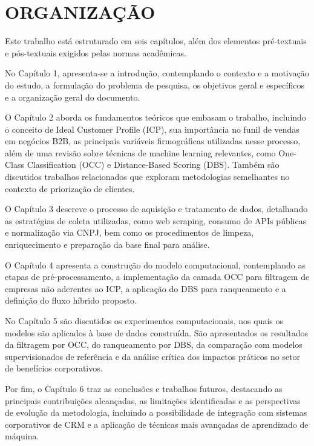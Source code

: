 \section{ORGANIZAÇÃO}

Este trabalho está estruturado em seis capítulos, além dos elementos pré-textuais e pós-textuais exigidos pelas normas acadêmicas.

No Capítulo 1, apresenta-se a introdução, contemplando o contexto e a motivação do estudo, a formulação do problema de pesquisa, os objetivos geral e específicos e a organização geral do documento.  

O Capítulo 2 aborda os fundamentos teóricos que embasam o trabalho, incluindo o conceito de Ideal Customer Profile (ICP), sua importância no funil de vendas em negócios B2B, as principais variáveis firmográficas utilizadas nesse processo, além de uma revisão sobre técnicas de machine learning relevantes, como One-Class Classification (OCC) e Distance-Based Scoring (DBS). Também são discutidos trabalhos relacionados que exploram metodologias semelhantes no contexto de priorização de clientes.  

O Capítulo 3 descreve o processo de aquisição e tratamento de dados, detalhando as estratégias de coleta utilizadas, como web scraping, consumo de APIs públicas e normalização via CNPJ, bem como os procedimentos de limpeza, enriquecimento e preparação da base final para análise.  

O Capítulo 4 apresenta a construção do modelo computacional, contemplando as etapas de pré-processamento, a implementação da camada OCC para filtragem de empresas não aderentes ao ICP, a aplicação do DBS para ranqueamento e a definição do fluxo híbrido proposto.  

No Capítulo 5 são discutidos os experimentos computacionais, nos quais os modelos são aplicados à base de dados construída. São apresentados os resultados da filtragem por OCC, do ranqueamento por DBS, da comparação com modelos supervisionados de referência e da análise crítica dos impactos práticos no setor de benefícios corporativos.  

Por fim, o Capítulo 6 traz as conclusões e trabalhos futuros, destacando as principais contribuições alcançadas, as limitações identificadas e as perspectivas de evolução da metodologia, incluindo a possibilidade de integração com sistemas corporativos de CRM e a aplicação de técnicas mais avançadas de aprendizado de máquina.